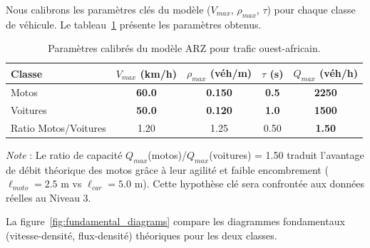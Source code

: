 Nous calibrons les paramètres clés du modèle ($V_{max}$, $\rho_{max}$, $\tau$) pour chaque classe de véhicule. Le tableau~\ref{tab:calibration_parameters} présente les paramètres obtenus.

\begin{table}[htbp]
    \centering
    \caption{Paramètres calibrés du modèle ARZ pour trafic ouest-africain.}
    \label{tab:calibration_parameters}
    \begin{tabular}{lcccc}
        \toprule
        \textbf{Classe}      & \textbf{$V_{max}$ (km/h)} & \textbf{$\rho_{max}$ (véh/m)} & \textbf{$\tau$ (s)} & \textbf{$Q_{max}$ (véh/h)} \\
        \midrule
        Motos                & \textbf{60.0}             & \textbf{0.150}                & \textbf{0.5}        & \textbf{2250}              \\
        Voitures             & \textbf{50.0}             & \textbf{0.120}                & \textbf{1.0}        & \textbf{1500}              \\
        \midrule
        Ratio Motos/Voitures & 1.20                      & 1.25                          & 0.50                & \textbf{1.50}              \\
        \bottomrule
    \end{tabular}

    \vspace{0.3cm}
    \footnotesize{\textit{Note} : Le ratio de capacité $Q_{max}$(motos)/$Q_{max}$(voitures) = 1.50 traduit
        l'avantage de débit théorique des motos grâce à leur agilité et faible encombrement ($\ell_{moto}=2.5$ m
        vs $\ell_{car}=5.0$ m). Cette hypothèse clé sera confrontée aux données réelles au Niveau 3.}
\end{table}

La figure~\ref{fig:fundamental_diagrams} compare les diagrammes fondamentaux (vitesse-densité, flux-densité) théoriques pour les deux classes.


